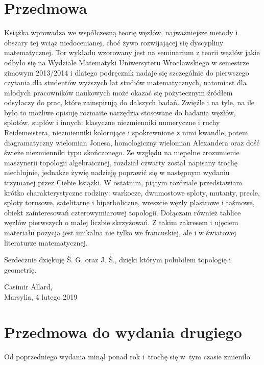 

\section*{Przedmowa}
Książka wprowadza we współczesną teorię węzłów, najważniejsze metody i obszary tej wciąż niedocenianej, choć żywo rozwijającej się dyscypliny matematycznej.
Tor wykładu wzorowany jest na seminarium z teorii węzłów jakie odbyło się na Wydziale Matematyki Uniwersytetu Wrocławskiego w semestrze zimowym 2013/2014 i dlatego podręcznik nadaje się szczególnie do pierwszego czytania dla studentów wyższych lat studiów matematycznych, natomiast dla młodych pracowników naukowych może okazać się pożytecznym źródłem odsyłaczy do prac, które zainspirują do dalszych badań.
Zwięźle i na tyle, na ile było to możliwe opisuję rozmaite narzędzia stosowane do badania węzłów, splotów, supłów i innych: klasyczne niezmienniki numeryczne i ruchy Reidemeistera, niezmienniki kolorujące i spokrewnione z nimi kwandle, potem diagramatyczny wielomian Jonesa, homologiczny wielomian Alexandera oraz dość świeże niezmienniki typu skończonego.
Ze względu na niepełne zrozumienie maszynerii topologii algebraicznej, rozdział czwarty został napisany trochę niechlujnie, jednakże żywię nadzieję poprawić się w następnym wydaniu trzymanej przez Ciebie książki.
W ostatnim, piątym rozdziale przedstawiam krótko charakterystyczne rodziny: warkocze, dwumostowe sploty, mutanty, precle, sploty torusowe, satelitarne i hiperboliczne, wreszcie węzły plastrowe i taśmowe, obiekt zainteresowań czterowymiarowej topologii.
Dołączam również tablice węzłów pierwszych o małej liczbie skrzyżowań.
Z takim zakresem i ujęciem materiału pozycja jest unikalna nie tylko we francuskiej, ale i w światowej literaturze matematycznej.

Serdecznie dziękuję Ś. G. oraz J. Ś., dzięki którym polubiłem topologię i geometrię.

\begin{flushright}
Casimir Allard,\\Marsylia, 4 lutego 2019
\end{flushright}

\section*{Przedmowa do wydania drugiego}
Od poprzedniego wydania minął ponad rok i~trochę się w~tym czasie zmieniło.


